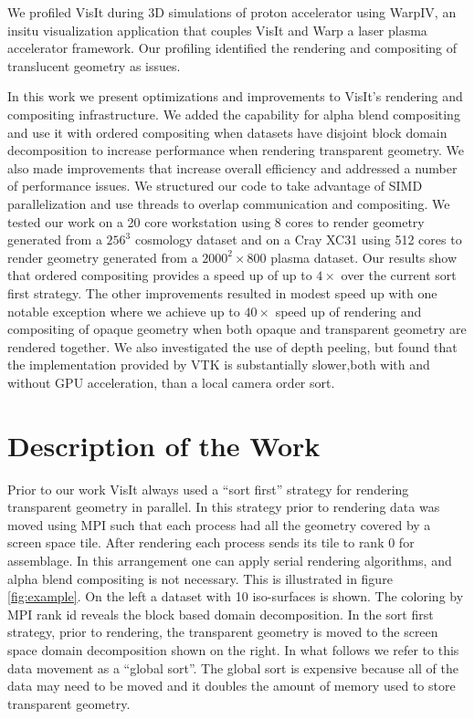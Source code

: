 \documentclass[a4paper,10pt]{report}
\begin{document}
We profiled VisIt during 3D simulations of proton accelerator\cite{stepan, olvier} using WarpIV\cite{warpiv}, an insitu visualization application that couples VisIt and Warp\cite{warp} a laser plasma accelerator framework. Our profiling identified the rendering and compositing of translucent geometry as issues.

In this work we present optimizations and improvements to VisIt's rendering and compositing infrastructure. We added the capability for alpha blend compositing and use it with ordered compositing when datasets have disjoint block domain decomposition to increase performance when rendering transparent geometry. We also made improvements that increase overall efficiency and addressed a number of performance issues. We structured our code to take advantage of SIMD parallelization and use threads to overlap communication and compositing. We tested our work on a 20 core workstation using 8 cores to render geometry generated from a $256^3$ cosmology dataset and on a Cray XC31 using 512 cores to render geometry generated from a $2000^2 \times 800$ plasma dataset. Our results show that ordered compositing provides a speed up of up to $4 \times$ over the current sort first strategy. The other improvements resulted in modest speed up with one notable exception where we achieve up to $40 \times$ speed up of rendering and compositing of opaque geometry when both opaque and transparent geometry are rendered together. We also investigated the use of depth peeling, but found that the implementation provided by VTK is substantially slower,both with and without GPU acceleration, than a local camera order sort.

\section{Description of the Work}
Prior to our work VisIt always used a ``sort first'' strategy for rendering transparent geometry in parallel. In this strategy prior to rendering data was moved using MPI such that each process had all the geometry covered by a screen space tile. After rendering each process sends its tile to rank 0 for assemblage. In this arrangement one can apply serial rendering algorithms, and alpha blend compositing is not necessary. This is illustrated in figure \ref{fig:example}. On the left a dataset with 10 iso-surfaces is shown. The coloring by MPI rank id reveals the block based domain decomposition. In the sort first strategy, prior to rendering, the transparent geometry is moved to the screen space domain decomposition shown on the right. In what follows we refer to this data movement as a ``global sort''. The global sort is expensive because all of the data may need to be moved and it doubles the amount of memory used to store transparent geometry.
\end{document}
